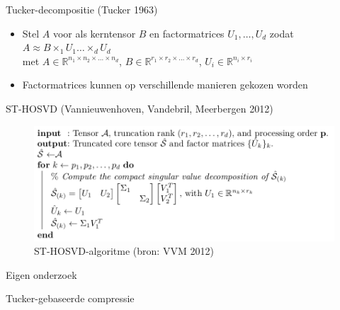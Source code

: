 \documentclass[t,12pt,dutch
\ifx\beamermode\undefined\else,\beamermode\fi
]{beamer}
\begin{document}
\begin{frame}{Tucker-decompositie (Tucker 1963)}

\begin{itemize}
\item Stel $A$ voor als kerntensor $B$ en factormatrices $U_1, \dots, U_d$ zodat\\
$A \approx B \times_1 U_1 \dots \times_d U_d$\\
met $A \in \mathbb{R}^{n_1 \times n_2 \times \dots \times n_d}$, $B \in \mathbb{R}^{r_1 \times r_2 \times \dots \times r_d}$, $U_i \in \mathbb{R}^{n_i \times r_i}$
\item Factormatrices kunnen op verschillende manieren gekozen worden
\end{itemize}

\end{frame}

\begin{frame}{ST-HOSVD (Vannieuwenhoven, Vandebril, Meerbergen 2012)}

\begin{figure}[H]
\centering
\includegraphics[scale=0.25]{images/ST-HOSVD.png}
\caption{ST-HOSVD-algoritme (bron: VVM 2012)}
\end{figure}

\end{frame}


\begin{frame}{}
\begin{center}
\vspace*{\fill}
\vspace*{\fill}
\Huge
Eigen onderzoek
\normalsize
\vspace*{\fill}
\end{center}
\end{frame}


\begin{frame}{}
\begin{center}
\vspace*{\fill}
\vspace*{\fill}
\Huge
Tucker-gebaseerde compressie
\normalsize
\vspace*{\fill}
\end{center}
\end{frame}
\end{document}
